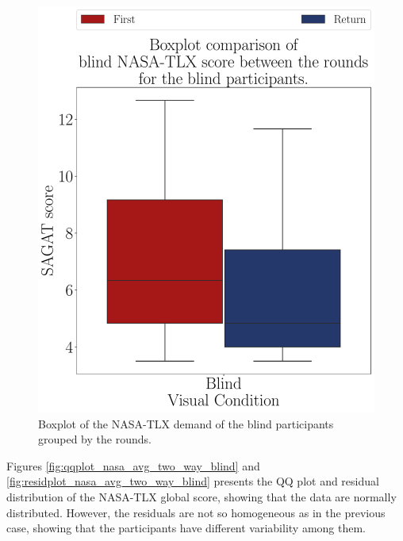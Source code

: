 \begin{figure}[!htb]
\begin{minipage}{0.45\textwidth}
        \includegraphics[width = \textwidth]{Resultados/Nasa/Figuras/pdf/boxplot_nasa_blind_rounds.pdf}
        \caption{Boxplot of the NASA-TLX demand of the blind participants grouped by the rounds.}
        \label{fig:boxplot_nasa_blind_rounds}
    \end{minipage}
\end{figure}

Figures \ref{fig:qqplot_nasa_avg_two_way_blind} and \ref{fig:residplot_nasa_avg_two_way_blind} presents the QQ plot and residual distribution of the NASA-TLX global score, showing that the data are normally distributed. However, the residuals are not so homogeneous as in the previous case, showing that the participants have different variability among them.

